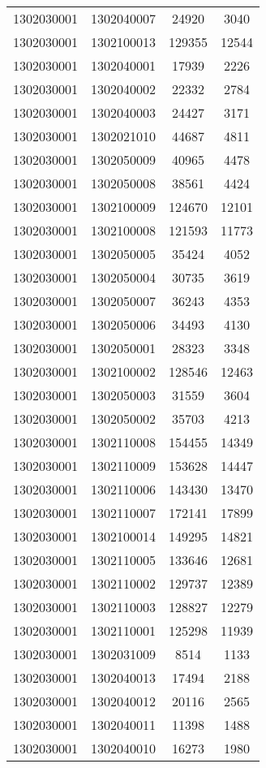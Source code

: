 \begin{longtable}[h]{llcc}
		1302030001 & 1302040007 & 24920 & 3040\\
		1302030001 & 1302100013 & 129355 & 12544\\
		1302030001 & 1302040001 & 17939 & 2226\\
		1302030001 & 1302040002 & 22332 & 2784\\
		1302030001 & 1302040003 & 24427 & 3171\\
		1302030001 & 1302021010 & 44687 & 4811\\
		1302030001 & 1302050009 & 40965 & 4478\\
		1302030001 & 1302050008 & 38561 & 4424\\
		1302030001 & 1302100009 & 124670 & 12101\\
		1302030001 & 1302100008 & 121593 & 11773\\
		1302030001 & 1302050005 & 35424 & 4052\\
		1302030001 & 1302050004 & 30735 & 3619\\
		1302030001 & 1302050007 & 36243 & 4353\\
		1302030001 & 1302050006 & 34493 & 4130\\
		1302030001 & 1302050001 & 28323 & 3348\\
		1302030001 & 1302100002 & 128546 & 12463\\
		1302030001 & 1302050003 & 31559 & 3604\\
		1302030001 & 1302050002 & 35703 & 4213\\
		1302030001 & 1302110008 & 154455 & 14349\\
		1302030001 & 1302110009 & 153628 & 14447\\
		1302030001 & 1302110006 & 143430 & 13470\\
		1302030001 & 1302110007 & 172141 & 17899\\
		1302030001 & 1302100014 & 149295 & 14821\\
		1302030001 & 1302110005 & 133646 & 12681\\
		1302030001 & 1302110002 & 129737 & 12389\\
		1302030001 & 1302110003 & 128827 & 12279\\
		1302030001 & 1302110001 & 125298 & 11939\\
		1302030001 & 1302031009 & 8514 & 1133\\
		1302030001 & 1302040013 & 17494 & 2188\\
		1302030001 & 1302040012 & 20116 & 2565\\
		1302030001 & 1302040011 & 11398 & 1488\\
		1302030001 & 1302040010 & 16273 & 1980\\

\end{longtable}
